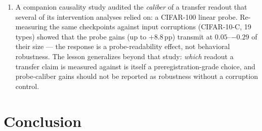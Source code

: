 \documentclass[10pt]{article}
\begin{document}
\begin{enumerate}
      while its denominator stays normal, levering the fitted slope
      --- and whose rerun under the same seed does not reproduce,
      so they are genuine run-level random events. A follow-up
      mechanism batch further showed the collapse to be a bistable
      geometric bifurcation locked within the first $40$ epochs:
      forking from a failed run's weights reproduces the failure
      in $4/4$ draws, forking from a healthy one reproduces health
      in $4/4$, and the scalar training loss shows no warning
      signal at any point --- only the geometry trajectory itself
      separates the two regimes early. Retrospective
      analysis of the curves further showed that no fixed subset of
      two or three dose points reproduces the five-point exponent
      ranking (the collapses concentrate in different dose segments
      per seed), so the effect cannot be cheaply screened. Any shape
      parameter quoted from one curve of one run should therefore be
      read as one draw from a heavy-tailed sampling distribution,
      not as a property of the architecture; cross-condition
      comparisons of such statistics need the per-condition median
      over at least four draws.
\item A companion causality study audited the \emph{caliber} of a
      transfer readout that several of its intervention analyses
      relied on: a CIFAR-100 linear probe. Re-measuring the same
      checkpoints against input corruptions (CIFAR-10-C, 19 types)
      showed that the probe gains (up to $+8.8$\,pp) transmit at
      $0.05$--$-0.29$ of their size --- the response is a
      probe-readability effect, not behavioral robustness. The
      lesson generalizes beyond that study: \emph{which} readout
      a transfer claim is measured against is itself a
      preregistration-grade choice, and probe-caliber gains
      should not be reported as robustness without a corruption
      control.
\end{enumerate}

\section{Conclusion}

\label{sec:conclusion}
\end{document}
